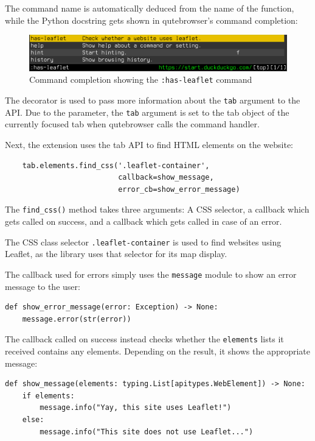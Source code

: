 The command name is automatically deduced from the name of the function, while
the Python docstring gets shown in qutebrowser's command completion:

\begin{figure}[H]
  \centering
  \includegraphics[width=\linewidth]{img/screenshot-completion.png}
  \caption{Command completion showing the \texttt{:has-leaflet} command}
\end{figure}

The  decorator is used to pass more information
about the \verb|tab| argument to the API. Due to the
 parameter, the \verb|tab| argument is set to
the tab object of the currently focused tab when qutebrowser calls the
command handler.

Next, the extension uses the tab API to find HTML elements on the website:

\begin{verbatim}
    tab.elements.find_css('.leaflet-container',
                          callback=show_message,
                          error_cb=show_error_message)
\end{verbatim}

The \verb|find_css()| method takes three arguments: A CSS selector, a callback
which gets called on success, and a callback which gets called in case of an
error.

The CSS class selector \verb|.leaflet-container| is used to find websites using
Leaflet, as the library uses that selector for its map display.

The callback used for errors simply uses the \verb|message| module to show an
error message to the user:

\begin{verbatim}
def show_error_message(error: Exception) -> None:
    message.error(str(error))
\end{verbatim}

The callback called on success instead checks whether the \verb|elements| lists
it received contains any elements. Depending on the result, it shows the
appropriate message:

\begin{verbatim}
def show_message(elements: typing.List[apitypes.WebElement]) -> None:
    if elements:
        message.info("Yay, this site uses Leaflet!")
    else:
        message.info("This site does not use Leaflet...")
\end{verbatim}

